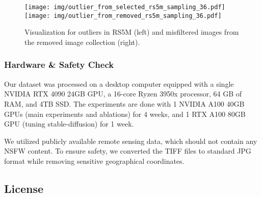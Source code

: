 \documentclass[journal]{IEEEtran}
\begin{document}
\begin{figure}[H]
    \centering
    \texttt{[image: img/outlier\_from\_selected\_rs5m\_sampling\_36.pdf]}
    \texttt{[image: img/outlier\_from\_removed\_rs5m\_sampling\_36.pdf]}
    \caption{Visualization for outliers in RS5M (left) and misfiltered images from the removed image collection (right).}
    \label{fig:sample_outlier_misfiltered}
\end{figure}




\subsubsection{Hardware \& Safety Check}
Our dataset was processed on a desktop computer equipped with a single NVIDIA RTX 4090 24GB GPU, a 16-core Ryzen 3950x processor, 64 GB of RAM, and 4TB SSD. The experiments are done with 1 NVIDIA A100 40GB GPUs (main experiments and ablations) for 4 weeks, and 1 RTX A100 80GB GPU (tuning stable-diffusion) for 1 week.

We utilized publicly available remote sensing data, which should not contain any NSFW content. To ensure safety, we converted the TIFF files to standard JPG format while removing sensitive geographical coordinates.


\subsection{License}
\label{appendix:license}
\end{document}
